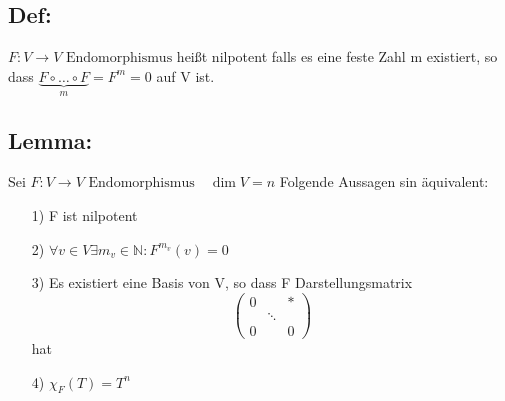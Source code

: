 \documentclass[titlepage,12pt,a4paper,ngerman]{report}
\newcommand{\enph}{F: V \to V \textrm{ Endomorphismus}}
\begin{document}
\subsection{Def:}
$\enph$ heißt nilpotent falls es eine feste Zahl m existiert, so dass $\underbrace{F\circ \dots \circ F}_{m} = F^m = 0$ auf V ist.
\subsection{Lemma:}
Sei $\enph \quad \dim V = n$ Folgende Aussagen sin äquivalent:
\begin{itemize}
	\item[1)] F ist nilpotent
	\item[2)] $\forall v \in V \exists m_v \in \mathbb{N}: F^{m_v}(v) = 0$
	\item[3)] Es existiert eine Basis von V, so dass F Darstellungsmatrix $$\begin{pmatrix}
	0 & & *\\
	& \ddots \\
	0 & & 0
	\end{pmatrix}$$ hat
	\item[4)] $\chi_F(T) = T^n$
\end{itemize}
\end{document}
